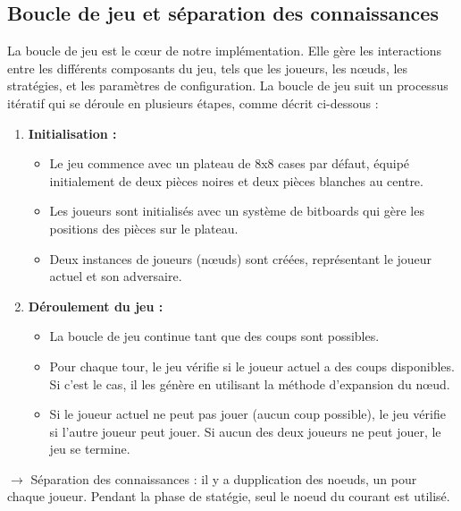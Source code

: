 \subsection{Boucle de jeu et séparation des connaissances}
\label{subsec:game_loop}
La boucle de jeu est le cœur de notre implémentation. Elle gère les interactions entre les différents composants du jeu, tels que les joueurs, les nœuds, les stratégies, et les paramètres de configuration. La boucle de jeu suit un processus itératif qui se déroule en plusieurs étapes, comme décrit ci-dessous :

\begin{enumerate}
    \item \textbf{Initialisation :}
    \begin{itemize}
        \item Le jeu commence avec un plateau de 8x8 cases par défaut, équipé initialement de deux pièces noires et deux pièces blanches au centre.
        \item Les joueurs sont initialisés avec un système de bitboards qui gère les positions des pièces sur le plateau.
        \item Deux instances de joueurs (nœuds) sont créées, représentant le joueur actuel et son adversaire.
    \end{itemize}
    
    \item \textbf{Déroulement du jeu :}
    \begin{itemize}
        \item La boucle de jeu continue tant que des coups sont possibles.
        \item Pour chaque tour, le jeu vérifie si le joueur actuel a des coups disponibles. Si c'est le cas, il les génère en utilisant la méthode d'expansion du nœud.
        \item Si le joueur actuel ne peut pas jouer (aucun coup possible), le jeu vérifie si l'autre joueur peut jouer. Si aucun des deux joueurs ne peut jouer, le jeu se termine.
    \end{itemize}
\end{enumerate}
$\rightarrow$ Séparation des connaissances : il y a dupplication des noeuds, un pour chaque joueur. Pendant la phase de statégie, seul le noeud du courant est utilisé.

